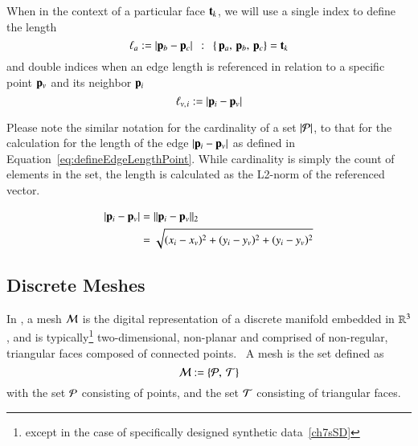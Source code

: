 When in the context of a particular face $\mathbf{t}_k$, we will use a single index to define the length
%
\begin{equation}
	\ell_a := |\mathbf{p}_b - \mathbf{p}_c| \enspace:\enspace \left \{\,\mathbf{p}_a,\,\mathbf{p}_b,\,\mathbf{p}_c\right \} = \mathbf{t}_k
	\label{eq:defineEdgeLengthFace}
\end{equation}%
%
%
and double indices when an edge length is referenced in relation to a specific point $\mathbf{p}_v$ and its neighbor $\mathbf{p}_i$
%
\begin{equation}
	\ell_{v,\kern.75pt i} := |\mathbf{p}_i - \mathbf{p}_v|
	\label{eq:defineEdgeLengthPoint}
\end{equation}%
%

Please note the similar notation for the cardinality of a set $|\mathcal{P}|$, to that for the calculation for the length of the edge $|\mathbf{p}_i - \mathbf{p}_v|$ as defined in Equation~\ref{eq:defineEdgeLengthPoint}. While cardinality is simply the count of elements in the set, the length is calculated as the L2-norm of the referenced vector.~\cite[p.~26]{Mara12}

\begin{equation}
\begin{aligned}
	|\mathbf{p}_i - \mathbf{p}_v| & = \lVert\mathbf{p}_i - \mathbf{p}_v\rVert_2 \\
					& = \sqrt{(x_i-x_v)^2 + (y_i-y_v)^2 + (y_i-y_v)^2}
	\label{eq:defineEdgeLengthCalc}
\end{aligned}
\end{equation}

%
%
%
%
\subsection{Discrete Meshes}
\label{ch2s3ssDM}
In \tdd{}, a mesh $\mathcal{M}$ is the digital representation of a discrete manifold embedded in $\mathbb{R}^{3}$, and is typically\footnote{except in the case of specifically designed synthetic data~\ref{ch7sSD}} two-dimensional, non-planar and comprised of non-regular, triangular faces composed of connected points.~\cite[p.~25]{Mara12} A mesh is the set defined as
%
\begin{equation}
	\mathcal{M} := \left \{\mathcal{P},\:\mathcal{T}\right \}
	\label{eq:defineMesh}
\end{equation}%
%
%
with the set $\mathcal{P}$ consisting of points, and the set $\mathcal{T}$ consisting of triangular faces.

